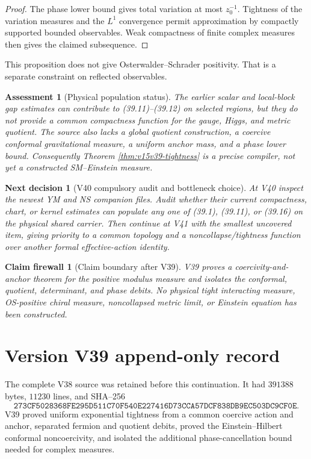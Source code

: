 \documentclass[11pt]{article}
\newtheorem{firewall}[theorem]{Claim firewall}
\newtheorem{decision}[theorem]{Next decision}
\newtheorem{assessment}[theorem]{Assessment}
\theoremstyle{remark}
\begin{document}
\begin{proof}
The phase lower bound gives total variation at most \(z_0^{-1}\).
Tightness of the variation measures and the \(L^1\) convergence
permit approximation by compactly supported bounded observables.
Weak compactness of finite complex measures then gives the claimed
subsequence.
\end{proof}

This proposition does not give Osterwalder--Schrader positivity.
That is a separate constraint on reflected observables.

\begin{assessment}[Physical population status]
\label{ass:v15v39-status}
The earlier scalar and local-block gap estimates can contribute to
(39.11)--(39.12) on selected regions, but they do not provide a
common compactness function for the gauge, Higgs, and metric
quotient.  The source also lacks a global quotient construction, a
coercive conformal gravitational measure, a uniform anchor mass, and
a phase lower bound.  Consequently Theorem
\ref{thm:v15v39-tightness} is a precise compiler, not yet a
constructed SM--Einstein measure.
\end{assessment}

\begin{decision}[V40 compulsory audit and bottleneck choice]
\label{dec:v15v39-next}
At V40 inspect the newest YM and NS companion files.  Audit whether
their current compactness, chart, or kernel estimates can populate
any one of (39.1), (39.11), or (39.16) on the physical shared
carrier.  Then continue at V41 with the smallest uncovered item,
giving priority to a common topology and a noncollapse/tightness
function over another formal effective-action identity.
\end{decision}

\begin{firewall}[Claim boundary after V39]
\label{fire:v15v39}
V39 proves a coercivity-and-anchor theorem for the positive modulus
measure and isolates the conformal, quotient, determinant, and phase
debits.  No physical tight interacting measure, OS-positive chiral
measure, noncollapsed metric limit, or Einstein equation has been
constructed.
\end{firewall}

\section*{Version V39 append-only record}
The complete V38 source was retained before this continuation.  It
had \(391388\) bytes, \(11230\) lines, and SHA--256
\[
 \texttt{273CF5028368FE295D511C70F540E227416D73CCA57DCF838DB9EC503DC9CF0E}.
\]
V39 proved uniform exponential tightness from a common coercive
action and anchor, separated fermion and quotient debits, proved the
Einstein--Hilbert conformal noncoercivity, and isolated the
additional phase-cancellation bound needed for complex measures.
\end{document}
